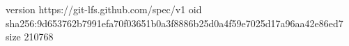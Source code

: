version https://git-lfs.github.com/spec/v1
oid sha256:9d653762b7991efa70f03651b0a3f8886b25d0a4f59e7025d17a96aa42e86ed7
size 210768
